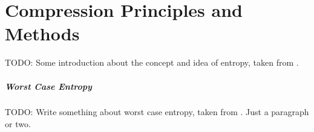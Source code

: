 
\chapter{Compression Principles and Methods} %

\label{ch:Chapter2} %

TODO: Some introduction about the concept and idea of entropy, taken from \cite{Shannon1948,navarro2016compact,han2002mathematics}.

\paragraph{Worst Case Entropy} TODO: Write something about worst case entropy, taken from \cite{navarro2016compact}. Just a paragraph or two.







% 
